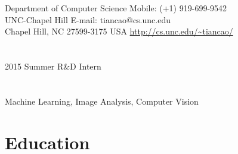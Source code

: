 \documentclass[line,margin]{res}
\begin{document}

\begin{resume}
\section{}
\smallskip
Department of Computer Science  \hfill { Mobile:}  (+1) 919-699-9542 \\
UNC-Chapel Hill \hfill { E-mail:}  tiancao@cs.unc.edu \\
Chapel Hill, NC 27599-3175 USA \hfill  \url{http://cs.unc.edu/~tiancao/} 

\section{}       

2015 Summer R\&D Intern

\vspace{-.05in}
\section{}       

Machine Learning, Image Analysis, Computer Vision %



\section{\sc Education}
\smallskip


\end{resume}
\end{document}
